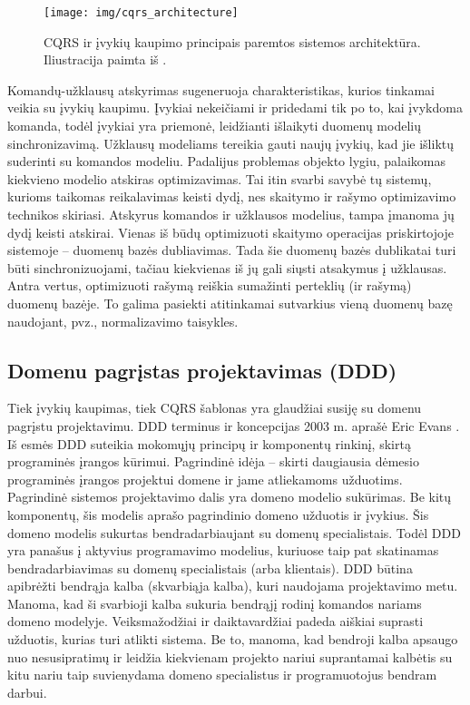 \begin{figure}[H]
    \centering
    \texttt{[image: img/cqrs\_architecture]}
    \caption{CQRS ir įvykių kaupimo principais paremtos sistemos architektūra. Iliustracija paimta iš \cite{cqrs:architecture}.}
    \label{img:cqrs_architecture}
\end{figure}

Komandų-užklausų atskyrimas sugeneruoja charakteristikas, kurios tinkamai veikia su įvykių kaupimu. Įvykiai nekeičiami ir pridedami tik po to, kai įvykdoma komanda, todėl įvykiai yra priemonė, leidžianti išlaikyti duomenų modelių sinchronizavimą. Užklausų modeliams tereikia gauti naujų įvykių, kad jie išliktų suderinti su komandos modeliu. Padalijus problemas objekto lygiu, palaikomas kiekvieno modelio atskiras optimizavimas. Tai itin svarbi savybė tų sistemų, kurioms taikomas reikalavimas keisti dydį, nes skaitymo ir rašymo optimizavimo technikos skiriasi. Atskyrus komandos ir užklausos modelius, tampa įmanoma jų dydį keisti atskirai. Vienas iš būdų optimizuoti skaitymo operacijas priskirtojoje sistemoje – duomenų bazės dubliavimas. Tada šie duomenų bazės dublikatai turi būti sinchronizuojami, tačiau kiekvienas iš jų gali siųsti atsakymus į užklausas. Antra vertus, optimizuoti rašymą reiškia sumažinti perteklių (ir rašymą) duomenų bazėje. To galima pasiekti atitinkamai sutvarkius vieną duomenų bazę naudojant, pvz., normalizavimo taisykles.

\subsection{Domenu pagrįstas projektavimas (DDD)}

Tiek įvykių kaupimas, tiek CQRS šablonas yra glaudžiai susiję su domenu pagrįstu projektavimu. DDD terminus ir koncepcijas 2003 m. aprašė Eric Evans \cite{evans2004domaindriven}. Iš esmės DDD suteikia mokomųjų principų ir komponentų rinkinį, skirtą programinės įrangos kūrimui. Pagrindinė idėja – skirti daugiausia dėmesio programinės įrangos projektui domene ir jame atliekamoms užduotims. Pagrindinė sistemos projektavimo dalis yra domeno modelio sukūrimas. Be kitų komponentų, šis modelis aprašo pagrindinio domeno užduotis ir įvykius. Šis domeno modelis sukurtas bendradarbiaujant su domenų specialistais. Todėl DDD yra panašus į aktyvius programavimo modelius, kuriuose taip pat skatinamas bendradarbiavimas su domenų specialistais (arba klientais). DDD būtina apibrėžti bendrąja kalba (skvarbiąja kalba), kuri naudojama projektavimo metu. Manoma, kad ši svarbioji kalba sukuria bendrąjį rodinį komandos nariams domeno modelyje. Veiksmažodžiai ir daiktavardžiai padeda aiškiai suprasti užduotis, kurias turi atlikti sistema. Be to, manoma, kad bendroji kalba apsaugo nuo nesusipratimų ir leidžia kiekvienam projekto nariui suprantamai kalbėtis su kitu nariu taip suvienydama domeno specialistus ir programuotojus bendram darbui.

